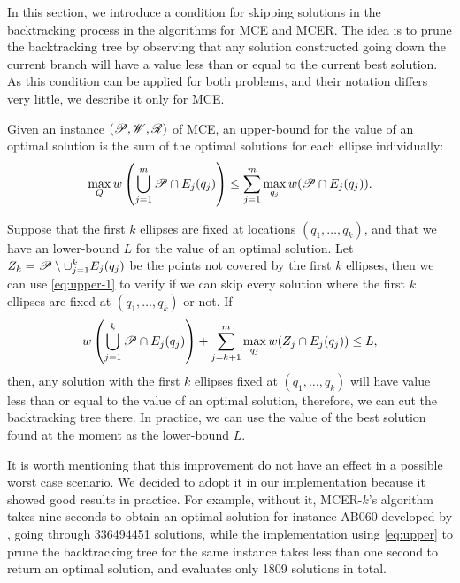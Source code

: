 In this section, we introduce a condition for skipping solutions in the backtracking process in the algorithms for MCE and MCER.
The idea is to prune the backtracking tree by observing that any solution constructed going down the current branch will have a value less than or equal to the current best solution.
As this condition can be applied for both problems, and their notation differs very little, we describe it only for MCE.

Given an instance $(\mathscr{P}, \mathscr{W}, \mathscr{R})$ of MCE, an upper-bound for the value of an optimal solution is the sum of the optimal solutions for each ellipse individually:
\begin{equation}\label{eq:upper-1}
\max_{Q} w\left(\bigcup_{j=1}^m \mathscr{P} \cap E_j(q_j)\right) \le \sum_{j=1}^m \max_{q_j} w(\mathscr{P} \cap E_j(q_j)).
\end{equation}

Suppose that the first $k$ ellipses are fixed at locations $(q_1,\dots, q_k)$, and that we have an lower-bound $L$ for the value of an optimal solution. Let $Z_k=\mathscr{P}\setminus \cup_{j=1}^k E_j(q_j)$ be the points not covered by the first $k$ ellipses, then we can use \autoref{eq:upper-1} to verify if we can skip every solution where the first $k$ ellipses are fixed at  $(q_1,\dots, q_k)$ or not.
If
\begin{equation}\label{eq:upper}
w\left(\bigcup_{j=1}^{k} \mathscr{P} \cap E_j(q_j)\right)+
\sum_{j=k+1}^m \max_{q_j} w(Z_j \cap E_j(q_j)) \le L,
\end{equation}
then, any solution with the first $k$ ellipses fixed at $(q_1,\dots, q_k)$ will have value less than or equal to the value of an optimal solution, therefore, we can cut the backtracking tree there. In practice, we can use the value of the best solution found at the moment as the lower-bound $L$.

It is worth mentioning that this improvement do not have an effect in a possible worst case scenario. We decided to adopt it in our implementation because it showed good results in practice.
For example, without it, 
MCER-$k$'s algorithm takes nine seconds to obtain an optimal solution for instance AB060 developed by \cite{andreta}, going through \num{336494451} solutions, while the implementation using \autoref{eq:upper} to prune the backtracking tree for the same instance takes less than one second to return an optimal solution, and evaluates only \num{1809} solutions in total.
